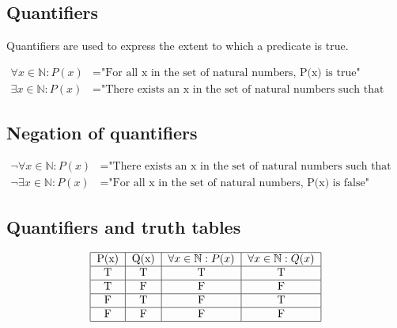 \documentclass{article}
\begin{document}
\subsection{Quantifiers}

Quantifiers are used to express the extent to which a predicate is true.

\begin{align*}
    \forall x \in \mathbb{N} : P(x) & = \text{"For all x in the set of natural numbers, P(x) is true"}                  \\
    \exists x \in \mathbb{N} : P(x) & = \text{"There exists an x in the set of natural numbers such that P(x) is true"}
\end{align*}

\subsection{Negation of quantifiers}

\begin{align*}
    \neg \forall x \in \mathbb{N} : P(x) & = \text{"There exists an x in the set of natural numbers such that P(x) is false"} \\
    \neg \exists x \in \mathbb{N} : P(x) & = \text{"For all x in the set of natural numbers, P(x) is false"}
\end{align*}

\subsection{Quantifiers and truth tables}

\begin{align*}
    \begin{tabular}{|c|c|c|c|}
        \hline
        P(x) & Q(x) & $\forall x \in \mathbb{N} : P(x)$ & $\forall x \in \mathbb{N} : Q(x)$ \\
        \hline
        T    & T    & T                                 & T                                 \\
        \hline
        T    & F    & F                                 & F                                 \\
        \hline
        F    & T    & F                                 & T                                 \\
        \hline
        F    & F    & F                                 & F                                 \\
        \hline
    \end{tabular}
\end{align*}
\end{document}
